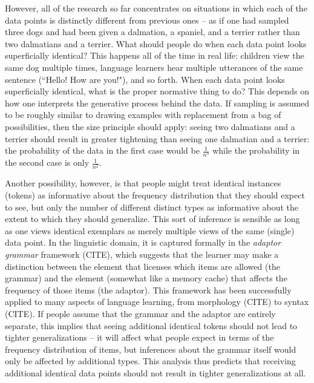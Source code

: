 \documentclass[10pt,letterpaper]{article}
\begin{document}
However, all of the research so far concentrates on situations in which each of the data points is distinctly different from previous ones -- as if one had sampled three dogs and had been given a dalmation, a spaniel, and a terrier rather than two dalmatians and a terrier. What should people do when each data point looks superficially identical? This happens all of the time in real life: children view the same dog multiple times, language learners hear multiple utterances of the same sentence (``Hello! How are you!"), and so forth. When each data point looks superficially identical, what is the proper normative thing to do? This depends on how one interprets the generative process behind the data. If sampling is assumed to be roughly similar to drawing examples with replacement from a bag of possibilities, then the size principle should apply: seeing two dalmatians and a terrier should result in greater tightening than seeing one dalmatian and a terrier: the probability of the data in the first case would be $\frac{1}{n^3}$ while the probability in the second case is only $\frac{1}{n^2}$.

Another possibility, however, is that people might treat identical instances (tokens) as informative about the frequency distribution that they should expect to see, but only the number of different distinct types as informative about the extent to which they should generalize. This sort of inference is sensible as long as one views identical exemplars as merely multiple views of the same (single) data point. In the linguistic domain, it is captured formally in the {\it adaptor grammar} framework (CITE), which suggests that the learner may make a distinction between the element that licenses which items are allowed (the grammar) and the element (somewhat like a memory cache) that affects the frequency of those items (the adaptor). This framework has been successfully applied to many aspects of language learning, from morphology (CITE) to syntax (CITE). If people assume that the grammar and the adaptor are entirely separate, this implies that seeing additional identical tokens should not lead to tighter generalizations -- it will affect what people expect in terms of the frequency distribution of items, but inferences about the grammar itself would only be affected by additional types. This analysis thus predicts that receiving additional identical data points should not result in tighter generalizations at all.
\end{document}
